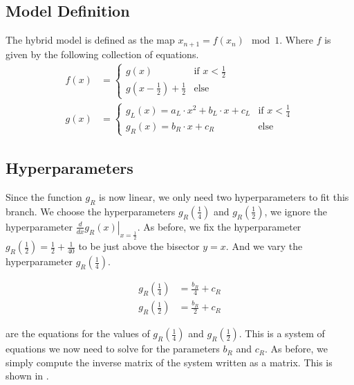 \subsection{Model Definition}
\label{sec:setup.quad.hybrid.definition}

The hybrid model is defined as the map $x_{n+1} = f(x_n) \mod 1$.
Where $f$ is given by the following collection of equations.
\begin{align}
	f(x) & = \begin{cases}
		         g(x)                             & \text{if } x < \frac{1}{2} \\
		         g(x - \frac{1}{2}) + \frac{1}{2} & \text{else}
	         \end{cases} \label{equ:quad.hybrid.f}           \\
	g(x) & = \begin{cases}
		         g_L(x) = a_L \cdot x^2 + b_L \cdot x + c_L & \text{if } x < \frac{1}{4} \\
		         g_R(x) = b_R \cdot x + c_R                 & \text{else}
	         \end{cases} \label{equ:quad.hybrid.g}
\end{align}

\subsection{Hyperparameters}
\label{sec:setup.quad.hybrid.parameters}

Since the function $g_R$ is now linear, we only need two hyperparameters to fit this branch.
We choose the hyperparameters $g_R\left(\frac{1}{4}\right)$ and $g_R\left(\frac{1}{2}\right)$, we ignore the hyperparameter $\left. \frac{d}{dx} g_R(x) \right|_{x = \frac{1}{2}}$.
As before, we fix the hyperparameter $g_R\left(\frac{1}{2}\right) = \frac{1}{2} + \frac{1}{40}$ to be just above the bisector $y = x$.
And we vary the hyperparameter $g_R\left(\frac{1}{4}\right)$.

\begin{subequations}
	\begin{align}
		g_R\left(\frac{1}{4}\right) & = \frac{b_R}{4} + c_R \label{equ:setup.quad.hybrid.A} \\
		g_R\left(\frac{1}{2}\right) & = \frac{b_R}{2} + c_R \label{equ:setup.quad.hybrid.B}
	\end{align}
\end{subequations}

 are the equations for the values of $g_R\left(\frac{1}{4}\right)$ and $g_R\left(\frac{1}{2}\right)$.
This is a system of equations we now need to solve for the parameters $b_R$ and $c_R$.
As before, we simply compute the inverse matrix of the system written as a matrix.
This is shown in .


